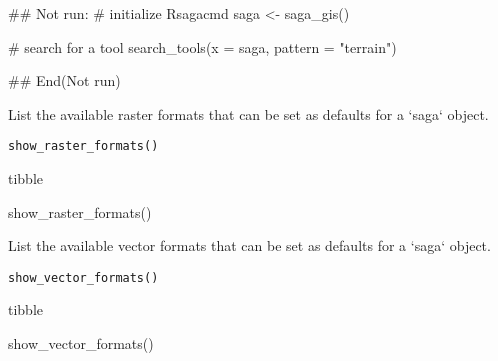 \documentclass[a4paper]{book}
\begin{document}
%
\begin{Examples}
\begin{ExampleCode}
## Not run: 
# initialize Rsagacmd
saga <- saga_gis()

# search for a tool
search_tools(x = saga, pattern = "terrain")

## End(Not run)
\end{ExampleCode}
\end{Examples}
%
\begin{Description}
List the available raster formats that can be set as defaults for a `saga`
object.
\end{Description}
%
\begin{Usage}
\begin{verbatim}
show_raster_formats()
\end{verbatim}
\end{Usage}
%
\begin{Value}
tibble
\end{Value}
%
\begin{Examples}
\begin{ExampleCode}
show_raster_formats()
\end{ExampleCode}
\end{Examples}
%
\begin{Description}
List the available vector formats that can be set as defaults for a `saga`
object.
\end{Description}
%
\begin{Usage}
\begin{verbatim}
show_vector_formats()
\end{verbatim}
\end{Usage}
%
\begin{Value}
tibble
\end{Value}
%
\begin{Examples}
\begin{ExampleCode}
show_vector_formats()
\end{ExampleCode}
\end{Examples}
\end{document}

